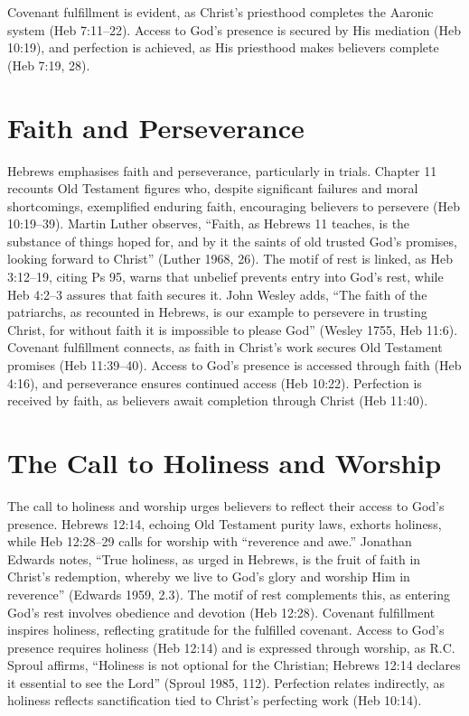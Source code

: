 \documentclass[12pt]{article}
\begin{document}
Covenant fulfillment is evident, as Christ’s priesthood completes the Aaronic
system (Heb 7:11--22). Access to God’s presence is secured by His mediation (Heb
10:19), and perfection is achieved, as His priesthood makes believers complete
(Heb 7:19, 28).

\section{Faith and Perseverance}
Hebrews emphasises faith and perseverance, particularly in trials. Chapter 11
recounts Old Testament figures who, despite significant failures and moral
shortcomings, exemplified enduring faith, encouraging believers to persevere
(Heb 10:19--39). Martin Luther observes, ``Faith, as Hebrews 11 teaches, is the
substance of things hoped for, and by it the saints of old trusted God’s
promises, looking forward to Christ'' (Luther 1968, 26). The motif of rest is
linked, as Heb 3:12--19, citing Ps 95, warns that unbelief prevents entry into
God’s rest, while Heb 4:2--3 assures that faith secures it. John Wesley adds,
``The faith of the patriarchs, as recounted in Hebrews, is our example to
persevere in trusting Christ, for without faith it is impossible to please
God'' (Wesley 1755, Heb 11:6). Covenant fulfillment connects, as faith in
Christ’s work secures Old Testament promises (Heb 11:39--40). Access to God’s
presence is accessed through faith (Heb 4:16), and perseverance ensures
continued access (Heb 10:22). Perfection is received by faith, as believers
await completion through Christ (Heb 11:40).

\section{The Call to Holiness and Worship}
The call to holiness and worship urges believers to reflect their access to
God’s presence. Hebrews 12:14, echoing Old Testament purity laws, exhorts
holiness, while Heb 12:28--29 calls for worship with ``reverence and awe.''
Jonathan Edwards notes, ``True holiness, as urged in Hebrews, is the fruit of
faith in Christ’s redemption, whereby we live to God’s glory and worship Him in
reverence'' (Edwards 1959, 2.3). The motif of rest complements this, as
entering God’s rest involves obedience and devotion (Heb 12:28). Covenant
fulfillment inspires holiness, reflecting gratitude for the fulfilled covenant.
Access to God’s presence requires holiness (Heb 12:14) and is expressed through
worship, as R.C. Sproul affirms, ``Holiness is not optional for the Christian;
Hebrews 12:14 declares it essential to see the Lord'' (Sproul 1985, 112).
Perfection relates indirectly, as holiness reflects sanctification tied to
Christ’s perfecting work (Heb 10:14).
\end{document}
